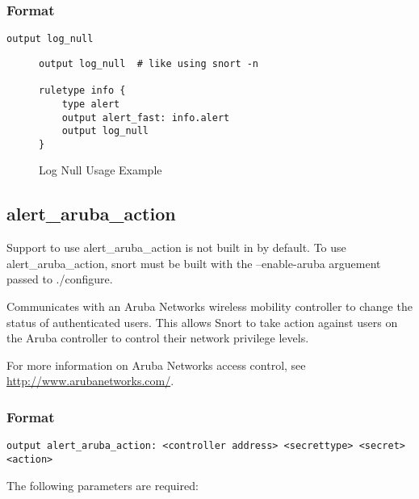 \documentclass[english]{report}
\newenvironment{note}{
\samepage
    \vspace{10pt}{\textsf{
        {\hspace{7pt}\Huge{$\triangle$\hspace{-12.5pt}{\Large{$^!$}}}}\hspace{5pt}
        {\Large{NOTE}}
    }
    }
   \begin{center}
    \par\vspace{-17pt}

    \begin{lrbox}{\savepar}
    \begin{minipage}[r]{6in}
}
{
    \end{minipage}
    \end{lrbox}
    \fbox{
        \usebox{
            \savepar
	}
    }
    \par\vskip10pt
    \end{center}
}
\begin{document}
\subsubsection{Format}

\begin{verbatim}
output log_null
\end{verbatim}
%
\begin{figure}[!hbpt]
\begin{verbatim}
output log_null  # like using snort -n

ruletype info {
    type alert
    output alert_fast: info.alert
    output log_null
}
\end{verbatim}
\caption{Log Null Usage Example\label{log null usage example}}
\end{figure}

\subsection{alert\_aruba\_action}

\begin{note}
Support to use alert\_aruba\_action is not built in by default.  To
use alert\_aruba\_action, snort must be built with the --enable-aruba
arguement passed to ./configure.
\end{note}

Communicates with an Aruba Networks wireless mobility controller to
change the status of authenticated users.  This allows Snort to take
action against users on the Aruba controller to control their network
privilege levels.

For more information on Aruba Networks access control, see
\url{http://www.arubanetworks.com/}.

\subsubsection{Format}

\begin{verbatim}
output alert_aruba_action: <controller address> <secrettype> <secret> <action>
\end{verbatim}
%
The following parameters are required:
\end{document}
